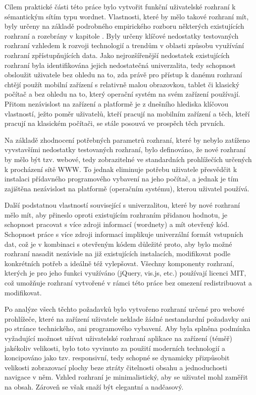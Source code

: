 \documentclass[a4paper, 11pt, oneside]{book}
\newcommand{\itNameRef}[1]{\textit{\nameref{#1}}}
\begin{document}

			Cílem praktické části této práce bylo vytvořit funkční uživatelské rozhraní k sémantickým sítím typu wordnet. Vlastnosti, které by mělo takové rozhraní mít, byly určeny na základě podrobného empirického rozboru některých existujících rozhraní a rozebrány v kapitole \itNameRef{cha:navrh}. Byly určeny klíčové nedostatky testovaných rozhraní vzhledem k rozvoji technologií a trendům v oblasti způsobu využívání rozhraní zpřístupňujících data. Jako nejrozšířenější nedostatek existujících rozhraní byla identifikována jejich nedostatečná univerzalita, tedy schopnost obsloužit uživatele bez ohledu na to, zda právě pro přístup k danému rozhraní chtějí použít mobilní zařízení s relativně malou obrazovkou, tablet či klasický počítač a bez ohledu na to, který operační systém na svém zařízení používají. Přitom nezávislost na zařízení a platformě je z dnešního hlediska klíčovou vlastností, ježto poměr uživatelů, kteří pracují na mobilním zařízení a těch, kteří pracují na klasickém počítači, se stále posouvá ve prospěch těch prvních.

			Na základě zhodnocení potřebných parametrů rozhraní, které by nebylo zatíženo vyvstavšími nedostatky testovaných rozhraní, bylo definováno, že nové rozhraní by mělo být tzv. webové, tedy zobrazitelné ve standardních prohlížečích určených k procházení sítě WWW. To jednak eliminuje potřebu uživatele přesvědčit k instalaci přídavného programového vybavení na jeho počítač, a jednak je tím zajištěna nezávislost na platformě (operačním systému), kterou uživatel používá. 

			Další podstatnou vlastností související s univerzalitou, které by nové rozhraní mělo mít, aby přineslo oproti existujícím rozhraním přidanou hodnotu, je schopnost pracovat s více zdroji informací (wordnety) a mít otevřený kód. Schopnost práce s více zdroji informací implikuje univerzální formát vstupních dat, což je v kombinaci s otevřeným kódem důležité proto, aby bylo možné rozhraní nasadit nezávisle na již existujících instalacích, modifikovat podle konkrétních potřeb a ideálně též vylepšovat. Všechny komponenty rozhraní, kterých je pro jeho funkci využíváno (jQuery, vis.js, etc.) používají licenci MIT, což umožňuje rozhraní vytvořené v rámci této práce bez omezení redistribuovat a modifikovat. 

			Po analýze všech těchto požadavků bylo vytvořeno rozhraní určené pro webové prohlížeče, které na zařízení uživatele neklade žádné nestandardní požadavky ani po stránce technického, ani programového vybavení. Aby byla splněna podmínka vyžadující možnost užívat uživatelské rozhraní aplikace na zařízení (téměř) jakékoliv velikosti, bylo toto vyvinuto za použití moderních technologií a koncipováno jako tzv. responsivní, tedy schopné se dynamicky přizpůsobit velikosti zobrazovací plochy beze ztráty čitelnosti obsahu a jednoduchosti navigace v něm. Vzhled rozhraní je minimalistický, aby se uživatel mohl zaměřit na obsah. Zároveň se však snaží být elegantní a nadčasový.
\end{document}
